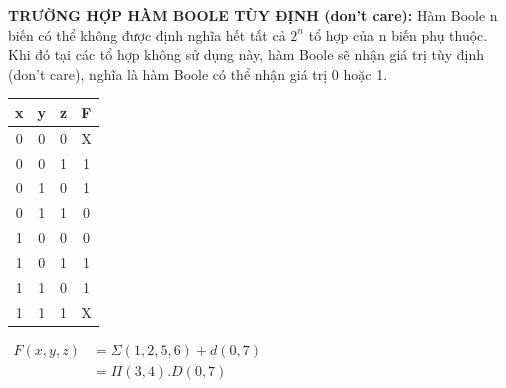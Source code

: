 \textbf{TRƯỜNG HỢP HÀM BOOLE TÙY ĐỊNH (don't care):} Hàm Boole n biến có thể không được định nghĩa hết tất cả $2^n$ tổ hợp của n biến phụ thuộc. Khi đó tại các tổ hợp không sử dụng này, hàm Boole sẽ nhận giá trị tùy định (don't care), nghĩa là hàm Boole có thể nhận giá trị 0 hoặc 1.
\begin{table}[h!]
    \centering
    \begin{tabular}{|ccc|c|}
    \hline
    \textbf{x} & \textbf{y} & \textbf{z} & \textbf{F} \\ \hline
    0          & 0          & 0          & X          \\
    0          & 0          & 1          & 1          \\
    0          & 1          & 0          & 1          \\
    0          & 1          & 1          & 0          \\
    1          & 0          & 0          & 0          \\
    1          & 0          & 1          & 1          \\
    1          & 1          & 0          & 1          \\
    1          & 1          & 1          & X          \\ \hline
    \end{tabular}
    \qquad
    $\begin{aligned}
        F(x,y,z) &= \varSigma (1,2,5,6) + d(0,7)\\
                 &= \varPi (3,4). D(0,7)
    \end{aligned}$
\end{table}
